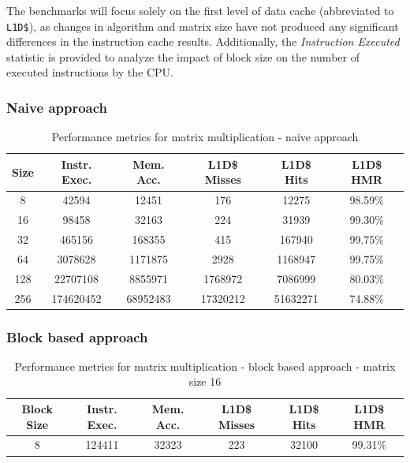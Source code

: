 \noindent The benchmarks will focus solely on the first level of data cache (abbreviated to \texttt{L1D\$}), as changes in algorithm and matrix size have not produced any
significant differences in the instruction cache results. Additionally, the \textit{Instruction Executed} statistic is provided to analyze the impact of block size on the number of
executed instructions by the CPU.


\subsubsection{Naive approach}

\begin{center}
\begin{table}[h!]
\centering
\begin{tabular}{|c|c|c|c|c|c|}
\hline
\textbf{Size} & \textbf{Instr. Exec.} & \textbf{Mem. Acc.} & \textbf{L1D\$ Misses} & \textbf{L1D\$ Hits} & \textbf{L1D\$ HMR} \\ \hline
8 & 42594 & 12451 & 176 & 12275 & 98.59\% \\ \hline
16 & 98458 & 32163 & 224 & 31939 & 99.30\% \\ \hline
32 & 465156 & 168355 & 415 & 167940 & 99.75\% \\ \hline
64 & 3078628 & 1171875 & 2928 & 1168947 & 99.75\% \\ \hline
128 & 22707108 & 8855971 & 1768972 & 7086999 & 80.03\% \\ \hline
256 & 174620452 & 68952483 & 17320212 & 51632271 & 74.88\% \\ \hline
\end{tabular}
\caption{Performance metrics for matrix multiplication - naive approach}
\label{tab:performance_metrics}
\end{table}
\end{center}

\subsubsection{Block based approach}

\begin{center}
\begin{table}[!htbp]
\centering
\begin{tabular}{|c|c|c|c|c|c|}
\hline
\textbf{Block Size} & \textbf{Instr. Exec.} & \textbf{Mem. Acc.} & \textbf{L1D\$ Misses} & \textbf{L1D\$ Hits} & \textbf{L1D\$ HMR} \\ \hline
8 & 124411 & 32323 & 223 & 32100 & 99.31\% \\ \hline
\end{tabular}
\caption{Performance metrics for matrix multiplication - block based approach - matrix size 16}
\label{tab:performance_metrics_16}
\end{table}
\end{center}

